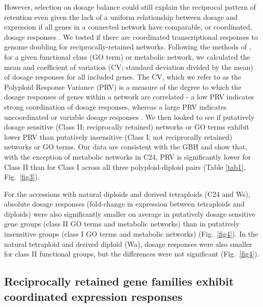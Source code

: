 \documentclass[11pt]{article}
\begin{document}
However, selection on dosage balance could still explain the reciprocal pattern of retention even given the lack of a uniform relationship between dosage and expression if all genes in a connected network have comparable, or coordinated, dosage responses \citep{coate2016}.
We tested if there are coordinated transcriptional responses to genome doubling for reciprocally-retained networks.
Following the methods of \cite{coate2016}, for a given functional class (GO term) or metabolic network, we calculated the mean and coefficient of variation (CV; standard deviation divided by the mean) of dosage responses for all included genes.
The CV, which we refer to as the Polyploid Response Variance (PRV) is a measure of the degree to which the dosage responses of genes within a network are correlated - a low PRV indicates strong coordination of dosage responses, whereas a large PRV indicates uncoordinated or variable dosage responses \citep{coate2016}.
We then looked to see if putatively dosage sensitive (Class II; reciprocally retained) networks or GO terms exhibit lower PRV than putatively insensitive (Class I; not reciprocally retained) networks or GO terms.
Our data are consistent with the GBH and show that, with the exception of metabolic networks in C24, PRV is significantly lower for Class II than for Class I across all three polyploid-diploid pairs (Table \ref{tab1}, Fig.~\ref{fig3}).

For the accessions with natural diploids and derived tetraploids (C24 and Ws), absolute dosage responses (fold-change in expression between tetraploids and diploids) were also significantly smaller on average in putatively dosage sensitive gene groups (class II GO terms and metabolic networks) than in putatively insensitive groups (class I GO terms and metabolic networks) (Fig.~\ref{fig4}).
In the natural tetraploid and derived diploid (Wa), dosage responses were also smaller for class II functional groups, but the differences were not significant (Fig.~\ref{fig4}).

\subsection*{Reciprocally retained gene families exhibit coordinated expression responses}
\end{document}
